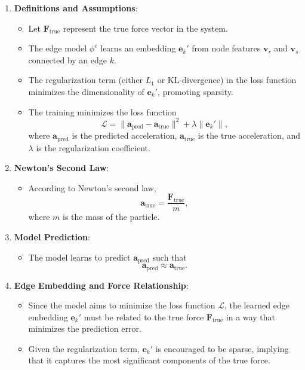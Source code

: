 \documentclass{article}
\begin{document}
\begin{enumerate}
    \item \textbf{Definitions and Assumptions}:
    \begin{itemize}
        \item Let \( \mathbf{F}_{\text{true}} \) represent the true force vector in the system.
        \item The edge model \( \phi^e \) learns an embedding \( \mathbf{e}_k' \) from node features \( \mathbf{v}_r \) and \( \mathbf{v}_s \) connected by an edge \( k \).
        \item The regularization term (either \( L_1 \) or KL-divergence) in the loss function minimizes the dimensionality of \( \mathbf{e}_k' \), promoting sparsity.
        \item The training minimizes the loss function 
        \[
        \mathcal{L} = \|\mathbf{a}_{\text{pred}} - \mathbf{a}_{\text{true}}\|^2 + \lambda \|\mathbf{e}_k'\|,
        \]
        where \( \mathbf{a}_{\text{pred}} \) is the predicted acceleration, \( \mathbf{a}_{\text{true}} \) is the true acceleration, and \( \lambda \) is the regularization coefficient.
    \end{itemize}

    \item \textbf{Newton's Second Law}:
    \begin{itemize}
        \item According to Newton's second law,
        \[
        \mathbf{a}_{\text{true}} = \frac{\mathbf{F}_{\text{true}}}{m},
        \]
        where \( m \) is the mass of the particle.
    \end{itemize}

    \item \textbf{Model Prediction}:
    \begin{itemize}
        \item The model learns to predict \( \mathbf{a}_{\text{pred}} \) such that 
        \[
        \mathbf{a}_{\text{pred}} \approx \mathbf{a}_{\text{true}}.
        \]
    \end{itemize}

    \item \textbf{Edge Embedding and Force Relationship}:
    \begin{itemize}
        \item Since the model aims to minimize the loss function \( \mathcal{L} \), the learned edge embedding \( \mathbf{e}_k' \) must be related to the true force \( \mathbf{F}_{\text{true}} \) in a way that minimizes the prediction error.
        \item Given the regularization term, \( \mathbf{e}_k' \) is encouraged to be sparse, implying that it captures the most significant components of the true force.
    \end{itemize}


\end{enumerate}
\end{document}
